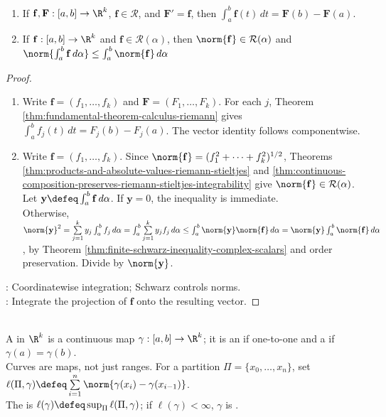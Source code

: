 \begin{theorem} \label{thm:vector-valued-integral-results} 
\begin{enumerate}[label=(\roman*)]
\setlength{\itemsep}{0pt}
\item If $\mathbf{f},\mathbf{F}:[a,b]\to\R^k$, $\mathbf{f}\in\mathcal{R}$, and $\mathbf{F}'=\mathbf{f}$, then $\int_a^b \mathbf{f}(t)\,dt=\mathbf{F}(b)-\mathbf{F}(a)$.
\item If $\mathbf{f}:[a,b]\to\R^k$ and $\mathbf{f}\in\mathcal{R}(\alpha)$, then $\norm{\mathbf{f}}\in\mathcal{R}(\alpha)$ and $\norm{\int_a^b \mathbf{f}\,d\alpha}\leq\int_a^b\norm{\mathbf{f}}\,d\alpha$
\end{enumerate}
\begin{proof}
\begin{enumerate}[label=(\roman*)]
\setlength{\itemsep}{0pt}
\item
Write $\mathbf{f}=(f_1,\ldots,f_k)$ and $\mathbf{F}=(F_1,\ldots,F_k)$. For each $j$, Theorem \ref{thm:fundamental-theorem-calculus-riemann} gives $\int_a^b f_j(t)\,dt=F_j(b)-F_j(a)$. The vector identity follows componentwise.
\item
Write $\mathbf{f}=(f_1,\ldots,f_k)$. Since $\norm{\mathbf{f}}=(f_1^2+\cdots+f_k^2)^{1/2}$, Theorems \ref{thm:products-and-absolute-values-riemann-stieltjes} and \ref{thm:continuous-composition-preserves-riemann-stieltjes-integrability} give $\norm{\mathbf{f}}\in\mathcal{R}(\alpha)$.\\
Let $\mathbf{y}\defeq\int_a^b\mathbf{f}\,d\alpha$. If $\mathbf{y}=0$, the inequality is immediate.\\
Otherwise, $\norm{\mathbf{y}}^2 =\sum\limits_{j=1}^{k}y_j\int_a^b f_j\,d\alpha =\int_a^b\sum\limits_{j=1}^{k}y_jf_j\,d\alpha \leq\int_a^b\norm{\mathbf{y}}\norm{\mathbf{f}}\,d\alpha =\norm{\mathbf{y}}\int_a^b\norm{\mathbf{f}}\,d\alpha$, by Theorem \ref{thm:finite-schwarz-inequality-complex-scalars} and order preservation. Divide by $\norm{\mathbf{y}}$.
\end{enumerate}
: Coordinatewise integration; Schwarz controls norms.\\
: Integrate the projection of $\mathbf{f}$ onto the resulting vector.
\end{proof}
\end{theorem}

\begin{definition} \label{def:curves-and-rectifiability} \\
A  in $\R^k$ is a continuous map $\gamma:[a,b]\to\R^k$; it is an  if one-to-one and a  if $\gamma(a)=\gamma(b)$.\\
Curves are maps, not just ranges. For a partition $\Pi=\{x_0,\ldots,x_n\}$, set $\ell(\Pi,\gamma)\defeq\sum\limits_{i=1}^{n}\norm{\gamma(x_i)-\gamma(x_{i-1})}$.\\
The  is $\ell(\gamma)\defeq\sup_\Pi\ell(\Pi,\gamma)$; if $\ell(\gamma)<\infty$, $\gamma$ is .
\end{definition}

